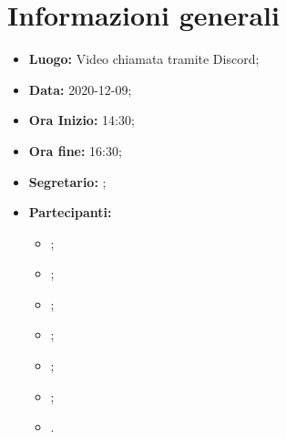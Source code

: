 \section{Informazioni generali}
	\begin{itemize}
		\item \textbf{Luogo:} Video chiamata tramite Discord;
		\item \textbf{Data:} 2020-12-09;
		\item \textbf{Ora Inizio:} 14:30;
		\item \textbf{Ora fine:} 16:30;
		\item \textbf{Segretario:} \SB;
		\item \textbf{Partecipanti:}
		\begin{itemize}
			\item \MB ;
			\item \VAS ;
			\item \FD ;
			\item \NM ;
			\item \SB ;
			\item \GB ;
			\item \MDI .
		\end{itemize}
		
	\end{itemize}